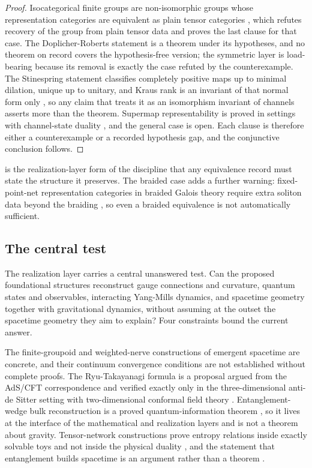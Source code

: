 \documentclass[11pt,letterpaper]{article}
\theoremstyle{definition}
\begin{document}
\begin{proof}
Isocategorical finite groups are non-isomorphic groups whose representation categories are equivalent as plain tensor categories \cite{corpus-12}, which refutes recovery of the group from plain tensor data and proves the last clause for that case. The Doplicher-Roberts statement is a theorem under its hypotheses, and no theorem on record covers the hypothesis-free version; the symmetric layer is load-bearing because its removal is exactly the case refuted by the counterexample. The Stinespring statement classifies completely positive maps up to minimal dilation, unique up to unitary, and Kraus rank is an invariant of that normal form only \cite{corpus-10,corpus-11}, so any claim that treats it as an isomorphism invariant of channels asserts more than the theorem. Supermap representability is proved in settings with channel-state duality \cite{corpus-40,corpus-41}, and the general case is open. Each clause is therefore either a counterexample or a recorded hypothesis gap, and the conjunctive conclusion follows.
\end{proof}

 is the realization-layer form of the discipline that any equivalence record must state the structure it preserves. The braided case adds a further warning: fixed-point-net representation categories in braided Galois theory require extra soliton data beyond the braiding \cite{corpus-21}, so even a braided equivalence is not automatically sufficient.

\subsection{The central test}

The realization layer carries a central unanswered test. Can the proposed foundational structures reconstruct gauge connections and curvature, quantum states and observables, interacting Yang-Mills dynamics, and spacetime geometry together with gravitational dynamics, without assuming at the outset the spacetime geometry they aim to explain? Four constraints bound the current answer.

The finite-groupoid and weighted-nerve constructions of emergent spacetime are concrete, and their continuum convergence conditions are not established without complete proofs. The Ryu-Takayanagi formula is a proposal argued from the AdS/CFT correspondence and verified exactly only in the three-dimensional anti-de Sitter setting with two-dimensional conformal field theory \cite{corpus-45}. Entanglement-wedge bulk reconstruction is a proved quantum-information theorem \cite{corpus-46}, so it lives at the interface of the mathematical and realization layers and is not a theorem about gravity. Tensor-network constructions prove entropy relations inside exactly solvable toys and not inside the physical duality \cite{corpus-48}, and the statement that entanglement builds spacetime is an argument rather than a theorem \cite{corpus-49}.
\end{document}
